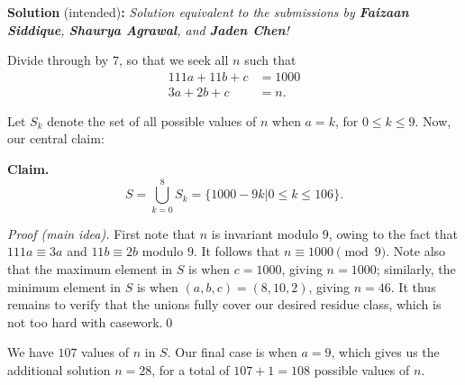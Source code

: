 
\begin{solution}
\textbf{Solution} (intended)\textbf{:}\newline
\textit{Solution equivalent to the submissions by \textbf{Faizaan Siddique}, \textbf{Shaurya Agrawal}, and \textbf{Jaden Chen}!}\V

Divide through by $7$, so that we seek all $n$ such that 
\begin{align*}
    111a+11b+c &= 1000 \\
    3a+2b+c &= n.
\end{align*}

Let $S_k$ denote the set of all possible values of $n$ when $a=k$, for $0\leq k\leq 9$. Now, our central claim:\V

\begin{claim}\textbf{Claim.}
\[S = \bigcup_{k=0}^8S_k = \{1000-9k\vert 0\leq k\leq 106\}.\]
\end{claim}\V

\textit{Proof (main idea).} First note that $n$ is invariant modulo $9$, owing to the fact that $111a\equiv 3a$ and $11b\equiv 2b$ modulo $9$. It follows that $n\equiv 1000\pmod{9}$. Note also that the maximum element in $S$ is when $c=1000$, giving $n=1000$; similarly, the minimum element in $S$ is when $(a,b,c) = (8,10,2)$, giving $n=46$. It thus remains to verify that the unions fully cover our desired residue class, which is not too hard with casework.\qed\V

We have $107$ values of $n$ in $S$. Our final case is when $a=9$, which gives us the additional solution $n=28$, for a total of $107+1 = \boxed{108}$ possible values of $n$.
\end{solution}